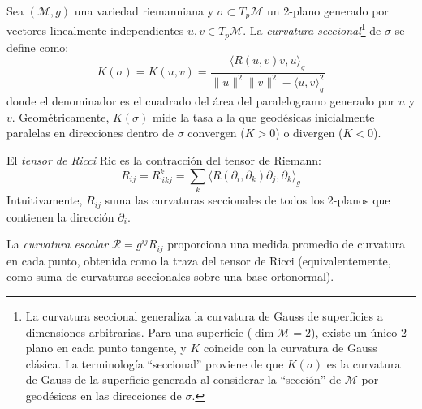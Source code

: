 \begin{definition}\label{def:curvatura_seccional}
Sea $(\mathcal{M}, g)$ una variedad riemanniana y $\sigma \subset T_p\mathcal{M}$ un 2-plano generado por vectores linealmente independientes $u, v \in T_p\mathcal{M}$. La \textit{curvatura seccional}\footnote{La curvatura seccional generaliza la curvatura de Gauss de superficies a dimensiones arbitrarias. Para una superficie ($\dim \mathcal{M} = 2$), existe un único 2-plano en cada punto tangente, y $K$ coincide con la curvatura de Gauss clásica. La terminología ``seccional'' proviene de que $K(\sigma)$ es la curvatura de Gauss de la superficie generada al considerar la ``sección'' de $\mathcal{M}$ por geodésicas en las direcciones de $\sigma$.} de $\sigma$ se define como:
\begin{equation}\label{eq:curvatura_seccional}
K(\sigma) = K(u,v) = \frac{\langle R(u,v)v, u \rangle_g}{\|u\|^2\|v\|^2 - \langle u,v \rangle_g^2}
\end{equation}
donde el denominador es el cuadrado del área del paralelogramo generado por $u$ y $v$. Geométricamente, $K(\sigma)$ mide la tasa a la que geodésicas inicialmente paralelas en direcciones dentro de $\sigma$ convergen ($K > 0$) o divergen ($K < 0$).
\end{definition}

\begin{definition}\label{def:ricci_escalar}
El \textit{tensor de Ricci} $\mathrm{Ric}$ es la contracción del tensor de Riemann:
\[
R_{ij} = R^k_{\ ikj} = \sum_{k} \langle R(\partial_i, \partial_k)\partial_j, \partial_k \rangle_g
\]
Intuitivamente, $R_{ij}$ suma las curvaturas seccionales de todos los 2-planos que contienen la dirección $\partial_i$.

La \textit{curvatura escalar} $\mathcal{R} = g^{ij}R_{ij}$ proporciona una medida promedio de curvatura en cada punto, obtenida como la traza del tensor de Ricci (equivalentemente, como suma de curvaturas seccionales sobre una base ortonormal).
\end{definition}

